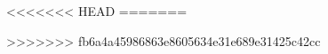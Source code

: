 % 
% 
% 
% 
% 
% 


% 

<<<<<<< HEAD
% 
=======

>>>>>>> fb6a4a45986863e8605634e31e689e31425c42cc
% 
% 
% 
% 

% 
% 
% 
% 
% 
% 
% 
% 
% 
% 

% 


% 
% 
% 
% 

% 
% 
% 
% 
% 
% 

% 
% 
% 
% 

% 
% 
% 

% 
% 

% 
% 
% 
% 
% 

% 
% 
% 
% 